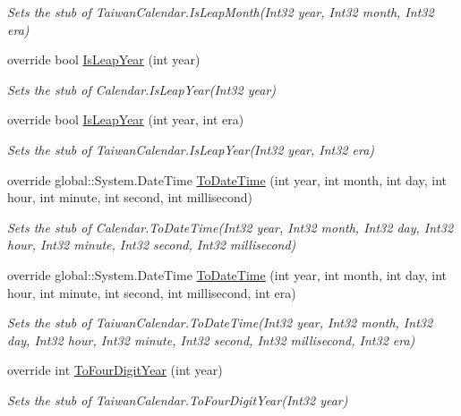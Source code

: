 \begin{DoxyCompactItemize}
\begin{DoxyCompactList}\small\item\em Sets the stub of Taiwan\-Calendar.\-Is\-Leap\-Month(\-Int32 year, Int32 month, Int32 era)\end{DoxyCompactList}\item 
override bool \hyperlink{class_system_1_1_globalization_1_1_fakes_1_1_stub_taiwan_calendar_a2b34a2295ebfc32b56947e38c661224c}{Is\-Leap\-Year} (int year)
\begin{DoxyCompactList}\small\item\em Sets the stub of Calendar.\-Is\-Leap\-Year(\-Int32 year)\end{DoxyCompactList}\item 
override bool \hyperlink{class_system_1_1_globalization_1_1_fakes_1_1_stub_taiwan_calendar_a0612c2cc965a5db2daf564ecdf76bf9b}{Is\-Leap\-Year} (int year, int era)
\begin{DoxyCompactList}\small\item\em Sets the stub of Taiwan\-Calendar.\-Is\-Leap\-Year(\-Int32 year, Int32 era)\end{DoxyCompactList}\item 
override global\-::\-System.\-Date\-Time \hyperlink{class_system_1_1_globalization_1_1_fakes_1_1_stub_taiwan_calendar_a13742f2818ea1b66a3c022d31598f75c}{To\-Date\-Time} (int year, int month, int day, int hour, int minute, int second, int millisecond)
\begin{DoxyCompactList}\small\item\em Sets the stub of Calendar.\-To\-Date\-Time(\-Int32 year, Int32 month, Int32 day, Int32 hour, Int32 minute, Int32 second, Int32 millisecond)\end{DoxyCompactList}\item 
override global\-::\-System.\-Date\-Time \hyperlink{class_system_1_1_globalization_1_1_fakes_1_1_stub_taiwan_calendar_a8af3a4b4a80d5a815bac4f8f77ed987f}{To\-Date\-Time} (int year, int month, int day, int hour, int minute, int second, int millisecond, int era)
\begin{DoxyCompactList}\small\item\em Sets the stub of Taiwan\-Calendar.\-To\-Date\-Time(\-Int32 year, Int32 month, Int32 day, Int32 hour, Int32 minute, Int32 second, Int32 millisecond, Int32 era)\end{DoxyCompactList}\item 
override int \hyperlink{class_system_1_1_globalization_1_1_fakes_1_1_stub_taiwan_calendar_a1a75c72c12a12c521707f71372057633}{To\-Four\-Digit\-Year} (int year)
\begin{DoxyCompactList}\small\item\em Sets the stub of Taiwan\-Calendar.\-To\-Four\-Digit\-Year(\-Int32 year)\end{DoxyCompactList}\end{DoxyCompactItemize}
